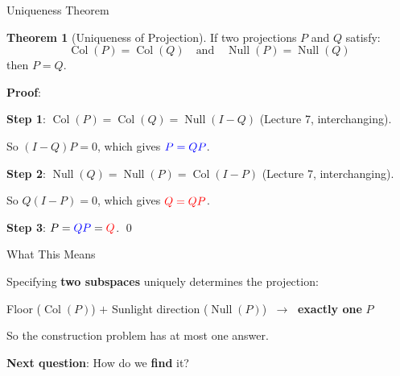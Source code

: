 \documentclass[10pt]{beamer}
\theoremstyle{definition}
\newtheorem{thm}{Theorem}[section]
\newcommand{\x}[1]{\alert{\textbf{#1}}}
\newcommand{\rd}[1]{{\color{red}#1}}                  %
\newcommand{\bl}[1]{{\color{blue}#1}}                 %
\begin{document}
\begin{frame}{Uniqueness Theorem}

\begin{thm}[Uniqueness of Projection]
If two projections $P$ and $Q$ satisfy:
$$\operatorname{Col}(P) = \operatorname{Col}(Q) \quad \text{and} \quad \operatorname{Null}(P) = \operatorname{Null}(Q)$$
then $P = Q$.
\end{thm}

\vspace{0.3em}

\textbf{Proof}:

\x{Step 1}: $\operatorname{Col}(P) = \operatorname{Col}(Q) = \operatorname{Null}(I-Q)$ (Lecture 7, interchanging).

So $(I-Q)P = 0$, which gives $\bl{P = QP}$.

\vspace{0.3em}

\x{Step 2}: $\operatorname{Null}(Q) = \operatorname{Null}(P) = \operatorname{Col}(I-P)$ (Lecture 7, interchanging).

So $Q(I-P) = 0$, which gives $\rd{Q = QP}$.

\vspace{0.3em}

\x{Step 3}: $P = \bl{QP} = \rd{Q}$. \qed

\end{frame}


\begin{frame}{What This Means}

Specifying \x{two subspaces} uniquely determines the projection:

\vspace{0.5em}

\begin{center}
Floor ($\operatorname{Col}(P)$) $+$ Sunlight direction ($\operatorname{Null}(P)$) $\;\longrightarrow\;$ \x{exactly one} $P$
\end{center}

\vspace{0.5em}

So the construction problem has at most one answer.

\vspace{0.5em}

\x{Next question}: How do we \x{find} it?

\end{frame}
\end{document}
